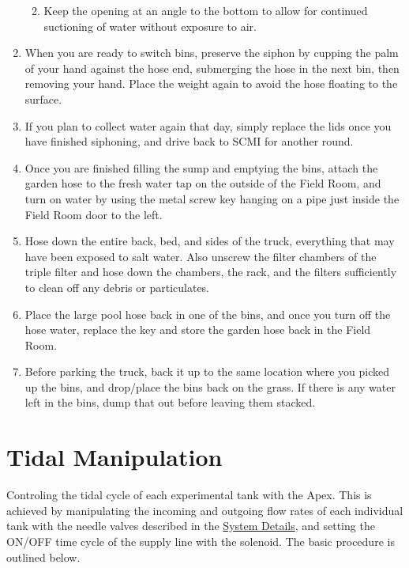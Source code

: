 \documentclass[]{book}
\providecommand{\tightlist}{%
  \setlength{\itemsep}{0pt}\setlength{\parskip}{0pt}}
\begin{document}
\begin{enumerate}
  \begin{enumerate}
  \def\labelenumii{\arabic{enumii}.}
  \tightlist
  \item
    Keep the opening at an angle to the bottom to allow for continued
    suctioning of water without exposure to air.
  \end{enumerate}
\item
  When you are ready to switch bins, preserve the siphon by cupping the
  palm of your hand against the hose end, submerging the hose in the
  next bin, then removing your hand. Place the weight again to avoid the
  hose floating to the surface.
\item
  If you plan to collect water again that day, simply replace the lids
  once you have finished siphoning, and drive back to SCMI for another
  round.
\item
  Once you are finished filling the sump and emptying the bins, attach
  the garden hose to the fresh water tap on the outside of the Field
  Room, and turn on water by using the metal screw key hanging on a pipe
  just inside the Field Room door to the left.
\item
  Hose down the entire back, bed, and sides of the truck, everything
  that may have been exposed to salt water. Also unscrew the filter
  chambers of the triple filter and hose down the chambers, the rack,
  and the filters sufficiently to clean off any debris or particulates.
\item
  Place the large pool hose back in one of the bins, and once you turn
  off the hose water, replace the key and store the garden hose back in
  the Field Room.
\item
  Before parking the truck, back it up to the same location where you
  picked up the bins, and drop/place the bins back on the grass. If
  there is any water left in the bins, dump that out before leaving them
  stacked.
\end{enumerate}

\chapter{Tidal Manipulation}\label{tidal-manipulation}

Controling the tidal cycle of each experimental tank with the Apex. This
is achieved by manipulating the incoming and outgoing flow rates of each
individual tank with the needle valves described in the
\protect\hyperlink{system-details}{System Details}, and setting the
ON/OFF time cycle of the supply line with the solenoid. The basic
procedure is outlined below.
\end{document}
